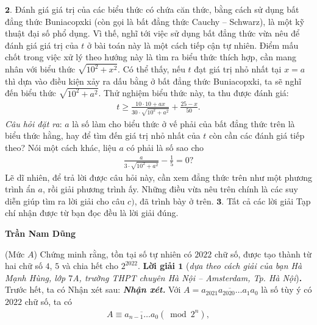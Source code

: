 \begin{multicols}{2}
	\vskip 0.05cm
	$\pmb{2.}$ Đánh giá giá trị của các biểu thức có chứa căn thức, bằng cách sử dụng bất đẳng thức Buniacopxki (còn gọi là bất đẳng thức Cauchy -- Schwarz), là một kỹ thuật đại số phổ dụng. Vì thế, nghĩ tới việc sử dụng bất đẳng thức vừa nêu để đánh giá giá trị của $t$ ở bài toán này là một cách tiếp cận tự nhiên. Điểm mấu chốt trong việc xử lý theo hướng này là tìm ra biểu thức thích hợp, cần mang nhân với biểu thức $\sqrt {{{10}^2} + {x^2}}$. Có thể thấy, nếu $t$ đạt giá trị nhỏ nhất tại $x = a$ thì dựa vào điều kiện xảy ra dấu bằng ở bất đẳng thức Buniacopxki, ta sẽ nghĩ đến biểu thức $\sqrt {{{10}^2} + {a^2}}$.  Thử nghiệm biểu thức này, ta thu được đánh giá:
	\begin{align*}
		t \ge \frac{{10 \cdot 10 + ax}}{{30 \cdot \sqrt {{{10}^2} + {a^2}} }} + \frac{{25 - x}}{{50}}.
	\end{align*}
	\textit{Câu hỏi đặt ra}: $a$ là số làm cho biểu thức ở vế phải của bất đẳng thức trên là biểu thức hằng, hay để tìm đến giá trị nhỏ nhất của $t$ còn cần các đánh giá tiếp theo? Nói một cách khác, liệu $a$ có phải là số sao cho
	\begin{align*}
		\frac{a}{{3 \cdot \sqrt {{{10}^2} + {a^2}} }} - \frac{1}{5} = 0?
	\end{align*}
	Lẽ dĩ nhiên, để trả lời được câu hỏi này, cần xem đẳng thức trên như một phương trình ẩn $a$, rồi giải phương trình ấy.
	\vskip 0.05cm
	Những điều vừa nêu trên chính là các suy diễn giúp tìm ra lời giải cho câu $c)$, đã trình bày ở trên.
	\vskip 0.05cm
	$\pmb{3.}$ Tất cả các lời giải Tạp chí nhận được từ bạn đọc đều là lời giải đúng.
	\begin{flushright}
		\textbf{\color{thachthuctoanhoc}Trần Nam Dũng}
	\end{flushright}
	{}
	(Mức $A$) Chứng minh rằng,  tồn tại số tự nhiên có $2022$ chữ số, được tạo thành từ hai chữ số $4$, $5$ và chia hết cho $2^{2022}$.
	\vskip 0.05cm
	\textbf{\color{thachthuctoanhoc}Lời giải $\pmb{1}$} (\textit{dựa theo cách giải của bạn Hà Mạnh Hùng, lớp $7$A, trường THPT chuyên Hà Nội -- Amsterdam, Tp. Hà Nội})\textbf{\color{thachthuctoanhoc}.}
	\vskip 0.05cm
	Trước hết, ta có Nhận xét sau:
	\vskip 0.05cm
	\textbf{\color{thachthuctoanhoc}\textit{Nhận xét.}} Với $A = \overline {{a_{2021}}{a_{2020}} \ldots {a_1}{a_0}} $  là số tùy ý có $2022$ chữ số, ta có
	\begin{align*}
		A \equiv \overline {{a_{n - 1}} \ldots {a_0}} \left( {\bmod {2^n}} \right),
	\end{align*}

\end{multicols}
